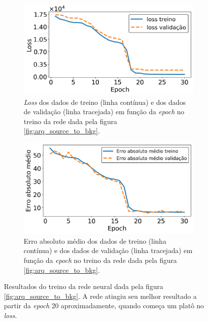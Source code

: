 \documentclass[a4paper,12pt,oneside]{book}
\begin{document}
\begin{figure}[H]
\centering
    \begin{subfigure}[t]{\textwidth}
        \centering
        \includegraphics[scale=0.51]{figs/source_to_bkg_loss.png}
        \caption{\textit{Loss} dos dados de treino (linha contínua) e dos dados de validação (linha tracejada) em função da \textit{epoch} no treino da rede dada pela figura \ref{fig:arq_source_to_bkg}.}
        \label{subfig:source_to_bkg_loss}
    \end{subfigure}%
    \vfill
    \begin{subfigure}[t]{\textwidth}
        \centering
        \includegraphics[scale=0.51]{figs/source_to_bkg_metric.png}
        \caption{Erro absoluto médio dos dados de treino (linha contínua) e dos dados de validação (linha tracejada) em função da \textit{epoch} no treino da rede dada pela figura \ref{fig:arq_source_to_bkg}.}
        \label{subfig:source_to_bkg_metric}
    \end{subfigure}
\caption{Resultados do treino da rede neural dada pela figura \ref{fig:arq_source_to_bkg}. A rede atingiu seu melhor resultado a partir da \textit{epoch} 20 aproximadamente, quando começa um 
platô no \textit{loss}.}
\label{fig:source_to_bkg_results}
\end{figure}
\end{document}
